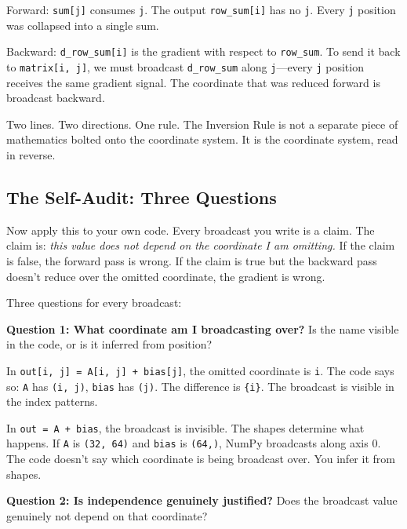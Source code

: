 \documentclass[11pt,titlepage]{article}
\begin{document}
Forward: \texttt{sum{[}j{]}} consumes \texttt{j}. The output
\texttt{row\_sum{[}i{]}} has no \texttt{j}. Every \texttt{j} position
was collapsed into a single sum.

Backward: \texttt{d\_row\_sum{[}i{]}} is the gradient with respect to
\texttt{row\_sum}. To send it back to \texttt{matrix{[}i,\ j{]}}, we
must broadcast \texttt{d\_row\_sum} along \texttt{j}---every \texttt{j}
position receives the same gradient signal. The coordinate that was
reduced forward is broadcast backward.

Two lines. Two directions. One rule. The Inversion Rule is not a
separate piece of mathematics bolted onto the coordinate system. It is
the coordinate system, read in reverse.

\vspace{2em}

\hypertarget{the-self-audit-three-questions}{%
\subsection{The Self-Audit: Three
Questions}\label{the-self-audit-three-questions}}

Now apply this to your own code. Every broadcast you write is a claim.
The claim is: \emph{this value does not depend on the coordinate I am
omitting.} If the claim is false, the forward pass is wrong. If the
claim is true but the backward pass doesn't reduce over the omitted
coordinate, the gradient is wrong.

Three questions for every broadcast:

\textbf{Question 1: What coordinate am I broadcasting over?} Is the name
visible in the code, or is it inferred from position?

In \texttt{out{[}i,\ j{]}\ =\ A{[}i,\ j{]}\ +\ bias{[}j{]}}, the omitted
coordinate is \texttt{i}. The code says so: \texttt{A} has
\texttt{(i,\ j)}, \texttt{bias} has \texttt{(j)}. The difference is
\texttt{\{i\}}. The broadcast is visible in the index patterns.

In \texttt{out\ =\ A\ +\ bias}, the broadcast is invisible. The shapes
determine what happens. If \texttt{A} is \texttt{(32,\ 64)} and
\texttt{bias} is \texttt{(64,)}, NumPy broadcasts along axis 0. The code
doesn't say which coordinate is being broadcast over. You infer it from
shapes.

\textbf{Question 2: Is independence genuinely justified?} Does the
broadcast value genuinely not depend on that coordinate?
\end{document}
